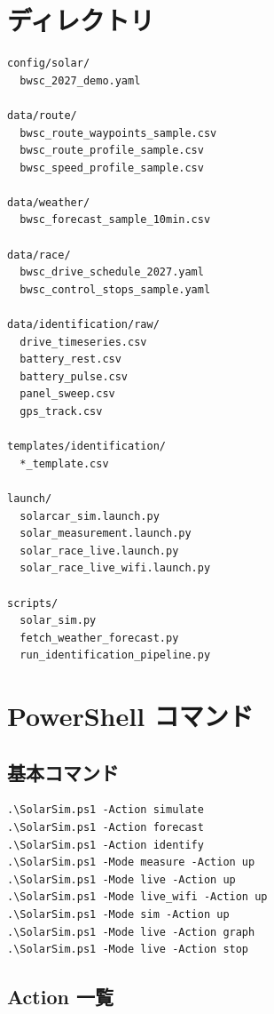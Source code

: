 \documentclass[a4paper,11pt]{article}
\begin{document}
\section{ディレクトリ}

\begin{Verbatim}[fontsize=\small]
config/solar/
  bwsc_2027_demo.yaml

data/route/
  bwsc_route_waypoints_sample.csv
  bwsc_route_profile_sample.csv
  bwsc_speed_profile_sample.csv

data/weather/
  bwsc_forecast_sample_10min.csv

data/race/
  bwsc_drive_schedule_2027.yaml
  bwsc_control_stops_sample.yaml

data/identification/raw/
  drive_timeseries.csv
  battery_rest.csv
  battery_pulse.csv
  panel_sweep.csv
  gps_track.csv

templates/identification/
  *_template.csv

launch/
  solarcar_sim.launch.py
  solar_measurement.launch.py
  solar_race_live.launch.py
  solar_race_live_wifi.launch.py

scripts/
  solar_sim.py
  fetch_weather_forecast.py
  run_identification_pipeline.py
\end{Verbatim}

\section{PowerShell コマンド}

\subsection{基本コマンド}

\begin{Verbatim}[fontsize=\small]
.\SolarSim.ps1 -Action simulate
.\SolarSim.ps1 -Action forecast
.\SolarSim.ps1 -Action identify
.\SolarSim.ps1 -Mode measure -Action up
.\SolarSim.ps1 -Mode live -Action up
.\SolarSim.ps1 -Mode live_wifi -Action up
.\SolarSim.ps1 -Mode sim -Action up
.\SolarSim.ps1 -Mode live -Action graph
.\SolarSim.ps1 -Mode live -Action stop
\end{Verbatim}

\subsection{Action 一覧}
\end{document}
